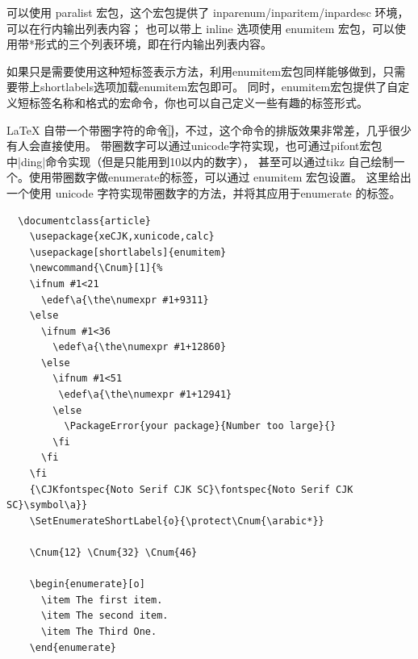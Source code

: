 可以使用 paralist 宏包，这个宏包提供了 inparenum/inparitem/inpardesc 环境，可以在行内输出列表内容；
也可以带上 inline 选项使用 enumitem 宏包，可以使用带*形式的三个列表环境，即在行内输出列表内容。



如果只是需要使用这种短标签表示方法，利用enumitem宏包同样能够做到，只需要带上shortlabels选项加载enumitem宏包即可。
同时，enumitem宏包提供了自定义短标签名称和格式的宏命令，你也可以自己定义一些有趣的标签形式。



\LaTeX{} 自带一个带圈字符的命令|\textcircled|，不过，这个命令的排版效果非常差，几乎很少有人会直接使用。
带圈数字可以通过unicode字符实现，也可通过pifont宏包中|ding|命令实现（但是只能用到10以内的数字），
甚至可以通过tikz 自己绘制一个。使用带圈数字做enumerate的标签，可以通过 enumitem 宏包设置。
这里给出一个使用 unicode 字符实现带圈数字的方法，并将其应用于enumerate 的标签。

\begin{verbatim}
  \documentclass{article}
    \usepackage{xeCJK,xunicode,calc}
    \usepackage[shortlabels]{enumitem}
    \newcommand{\Cnum}[1]{%
    \ifnum #1<21
      \edef\a{\the\numexpr #1+9311}
    \else
      \ifnum #1<36
        \edef\a{\the\numexpr #1+12860}
      \else
        \ifnum #1<51
         \edef\a{\the\numexpr #1+12941}
        \else
          \PackageError{your package}{Number too large}{}
        \fi
      \fi
    \fi
    {\CJKfontspec{Noto Serif CJK SC}\fontspec{Noto Serif CJK SC}\symbol\a}}
    \SetEnumerateShortLabel{o}{\protect\Cnum{\arabic*}}
    
    \Cnum{12} \Cnum{32} \Cnum{46} 
    
    \begin{enumerate}[o]
      \item The first item.
      \item The second item.
      \item The Third One.
    \end{enumerate}
    
\end{verbatim}


